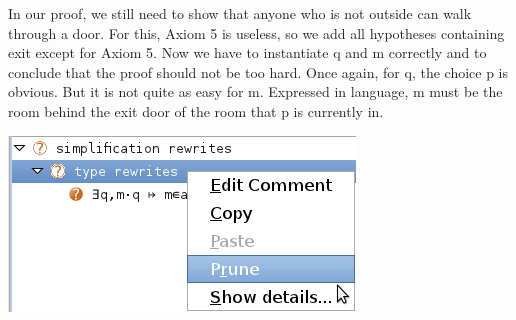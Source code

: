 In our proof, we still need to show that anyone who is not outside can walk through a door. For this, Axiom 5 is useless, so we add all hypotheses containing exit except for Axiom 5. Now we have to instantiate q and m correctly and to conclude that the proof should not be too hard. Once again, for q, the choice p is obvious. But it is not quite as easy for m. Expressed in language, m must be the room behind the exit door of the room that p is currently in. 

\begin{center}
	\includegraphics[]{img/tutorial/tut_10_prune.png}
\end{center}

